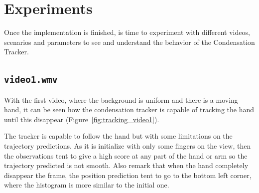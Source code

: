 \documentclass{ethz_report}
\begin{document}


\section*{Experiments}

Once the implementation is finished, is time to experiment with different videos, scenarios and parameters to see and understand the behavior of the Condensation Tracker.

\subsection*{\texttt{video1.wmv}}

With the first video, where the background is uniform and there is a moving hand, it can be seen how the condensation tracker is capable of tracking the hand until this disappear (Figure~\ref{fig:tracking_video1}).

The tracker is capable to follow the hand but with some limitations on the trajectory predictions. As it is initialize with only some fingers on the view, then the observations tent to give a high score at any part of the hand or arm so the trajectory predicted is not smooth. Also remark that when the hand completely disappear the frame, the position prediction tent to go to the bottom left corner, where the histogram is more similar to the initial one.
\end{document}
